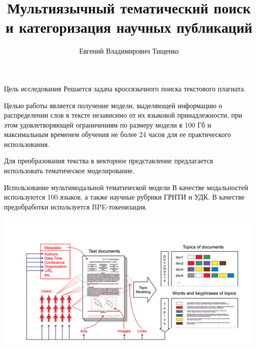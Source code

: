 \documentclass{beamer}
\title[\hbox to 56mm{Порождение признаков}]{Мультиязычный тематический поиск и категоризация научных публикаций}
\author[Н.\,П. Ивкин]{Евгений Владимирович Тищенко}
\institute{Московский физико-технический институт}
\date{\footnotesize
\par\smallskip\emph{Эксперт:} К.\,В.~Воронцов
\par\smallskip\emph{Консультант:} П.\,С.~Потапова
\par\bigskip\small 2021}
\begin{document}
\begin{frame}
\thispagestyle{empty}
\maketitle
\end{frame}
\begin{frame}{Цель исследования}
Решается задача кроссязычного поиска текстового плагиата.
\bigskip

Целью работы является получение модели, выделяющей информацию о распределении слов в тексте независимо от их языковой принадлежности, при этом удовлетворяющей ограничениям по размеру модели в 100 Гб и максимальным временем обучения не более 24 часов для ее практического использования.

\bigskip
Для преобразования текства в векторное представление предлагается использовать тематическое моделирование.

\end{frame}
\begin{frame}{Использование мультимодальной тематической модели}
В качестве модальностей используются {\color{red}100} языков, а также научные рубрики ГРНТИ и УДК. В качестве предобработки используется {\color{red}BPE-токенизация}.

\includegraphics[width=\textwidth]{modals.png}



\end{frame}
\end{document}
